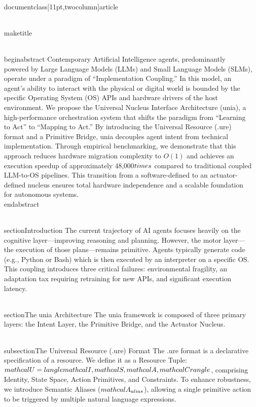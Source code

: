 \\documentclass[11pt,twocolumn]{article}
\begin{document}
\\maketitle

\\begin{abstract}
Contemporary Artificial Intelligence agents, predominantly powered by Large Language Models (LLMs) and Small Language Models (SLMs), operate under a paradigm of ``Implementation Coupling.'' In this model, an agent's ability to interact with the physical or digital world is bounded by the specific Operating System (OS) APIs and hardware drivers of the host environment. We propose the Universal Nucleus Interface Architecture (unia), a high-performance orchestration system that shifts the paradigm from ``Learning to Act'' to ``Mapping to Act.'' By introducing the Universal Resource (.ure) format and a Primitive Bridge, unia decouples agent intent from technical implementation. Through empirical benchmarking, we demonstrate that this approach reduces hardware migration complexity to $O(1)$ and achieves an execution speedup of approximately 48,000$\\times$ compared to traditional coupled LLM-to-OS pipelines. This transition from a software-defined to an actuator-defined nucleus ensures total hardware independence and a scalable foundation for autonomous systems.
\\end{abstract}

\\section{Introduction}
The current trajectory of AI agents focuses heavily on the cognitive layer—improving reasoning and planning. However, the motor layer—the execution of those plans—remains primitive. Agents typically generate code (e.g., Python or Bash) which is then executed by an interpreter on a specific OS. This coupling introduces three critical failures: environmental fragility, an adaptation tax requiring retraining for new APIs, and significant execution latency.

\\section{The unia Architecture}
The unia framework is composed of three primary layers: the Intent Layer, the Primitive Bridge, and the Actuator Nucleus.

\\subsection{The Universal Resource (.ure) Format}
The .ure format is a declarative specification of a resource. We define it as a Resource Tuple: $\\mathcal{U} = \\langle \\mathcal{I}, \\mathcal{S}, \\mathcal{A}, \\mathcal{C} \\rangle$, comprising Identity, State Space, Action Primitives, and Constraints. To enhance robustness, we introduce Semantic Aliases ($\\mathcal{A}_{alias}$), allowing a single primitive action to be triggered by multiple natural language expressions.
\end{document}
